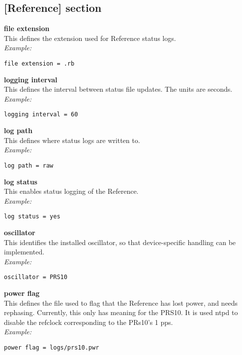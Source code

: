 \subsection{[Reference] section}

\hypertarget{h:reference}{}

{\bfseries file extension}\\
This defines the extension used for Reference status logs.\\
\textit{Example:}
\begin{lstlisting}
file extension = .rb
\end{lstlisting}

{\bfseries logging interval}\\
This defines the interval between status file updates. The units are seconds.\\
\textit{Example:}
\begin{lstlisting}
logging interval = 60
\end{lstlisting}

{\bfseries log path}\\
This defines where status logs are written to.\\
\textit{Example:}
\begin{lstlisting}
log path = raw
\end{lstlisting}

{\bfseries log status}\\
This enables status logging of the Reference.\\
\textit{Example:}
\begin{lstlisting}
log status = yes
\end{lstlisting}

{\bfseries oscillator}\\
This identifies the installed oscillator, so that device-specific handling can be implemented.\\
\textit{Example:}
\begin{lstlisting}
oscillator = PRS10
\end{lstlisting}

{\bfseries power flag}\\
This defines the file used to flag that the Reference has lost power, and needs rephasing.
Currently, this only has meaning for the PRS10. It is used ntpd to disable the refclock
corresponding to the PRs10's 1 pps.\\
\textit{Example:}
\begin{lstlisting}
power flag = logs/prs10.pwr
\end{lstlisting}

